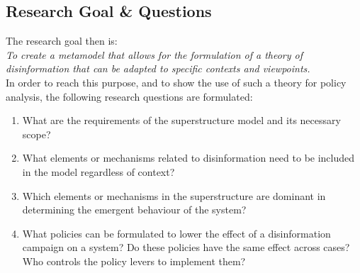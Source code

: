 \begin{comment}
Need to address this: 

This purpose is not so very different from that of exploratory modeling as described by Bankes (1993). He proposed exploratory modeling as an approach in cases where there is insufficient or uncertain knowledge about the system of interest. Exploratory modeling explores the consequences of changing assumptions or mechanisms through simulation experiments.
\end{comment}





\subsection{Research Goal \& Questions}
The research goal then is: \\

\textit{To create a metamodel that allows for the formulation of a theory of disinformation that can be adapted to specific contexts and viewpoints.} \\


In order to reach this purpose, and to show the use of such a theory for policy analysis, the following research questions are formulated: 
\begin{enumerate}
	\item What are the requirements of the superstructure model and its necessary scope?
	\item What elements or mechanisms related to disinformation need to be included in the model regardless of context?
	\item Which elements or mechanisms in the superstructure are dominant in determining the emergent behaviour of the system?
	\item What policies can be formulated to lower the effect of a disinformation campaign on a system? Do these policies have the same effect across cases? Who controls the policy levers to implement them?
\end{enumerate}



